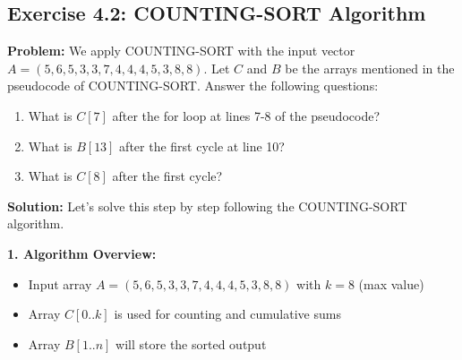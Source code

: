 \subsection{Exercise 4.2: COUNTING-SORT Algorithm}
\textbf{Problem:} We apply COUNTING-SORT with the input vector $A = (5,6,5,3,3,7,4,4,4,5,3,8,8)$. Let $C$ and $B$ be the arrays mentioned in the pseudocode of COUNTING-SORT. Answer the following questions:

\begin{enumerate}[leftmargin=*,noitemsep]
    \item What is $C[7]$ after the for loop at lines 7-8 of the pseudocode?
    \item What is $B[13]$ after the first cycle at line 10?
    \item What is $C[8]$ after the first cycle?
\end{enumerate}

\textbf{Solution:} Let's solve this step by step following the COUNTING-SORT algorithm.

\textbf{1. Algorithm Overview:}
\begin{itemize}[noitemsep]
    \item Input array $A = (5,6,5,3,3,7,4,4,4,5,3,8,8)$ with $k=8$ (max value)
    \item Array $C[0..k]$ is used for counting and cumulative sums
    \item Array $B[1..n]$ will store the sorted output
\end{itemize}

